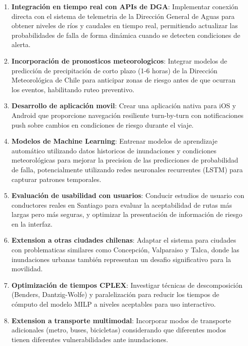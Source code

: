 \documentclass[conference]{IEEEtran}
\begin{document}
\begin{enumerate}
    \item \textbf{Integración en tiempo real con APIs de DGA}: Implementar conexión directa con el sistema de telemetria de la Dirección General de Aguas para obtener niveles de ríos y caudales en tiempo real, permitiendo actualizar las probabilidades de falla de forma dinámica cuando se detecten condiciones de alerta.

    \item \textbf{Incorporación de pronosticos meteorologicos}: Integrar modelos de predicción de precipitación de corto plazo (1-6 horas) de la Dirección Meteorológica de Chile para anticipar zonas de riesgo antes de que ocurran los eventos, habilitando ruteo preventivo.

    \item \textbf{Desarrollo de aplicación movil}: Crear una aplicación nativa para iOS y Android que proporcione navegación resiliente turn-by-turn con notificaciones push sobre cambios en condiciones de riesgo durante el viaje.

    \item \textbf{Modelos de Machine Learning}: Entrenar modelos de aprendizaje automático utilizando datos historicos de inundaciones y condiciones meteorológicas para mejorar la precision de las predicciones de probabilidad de falla, potencialmente utilizando redes neuronales recurrentes (LSTM) para capturar patrones temporales.

    \item \textbf{Evaluación de usabilidad con usuarios}: Conducir estudios de usuario con conductores reales en Santiago para evaluar la aceptabilidad de rutas más largas pero más seguras, y optimizar la presentación de información de riesgo en la interfaz.

    \item \textbf{Extension a otras ciudades chilenas}: Adaptar el sistema para ciudades con problematicas similares como Concepción, Valparaiso y Talca, donde las inundaciones urbanas también representan un desafio significativo para la movilidad.

    \item \textbf{Optimización de tiempos CPLEX}: Investigar técnicas de descomposición (Benders, Dantzig-Wolfe) y paralelización para reducir los tiempos de cómputo del modelo MILP a niveles aceptables para uso interactivo.

    \item \textbf{Extension a transporte multimodal}: Incorporar modos de transporte adicionales (metro, buses, bicicletas) considerando que diferentes modos tienen diferentes vulnerabilidades ante inundaciones.
\end{enumerate}
\end{document}
